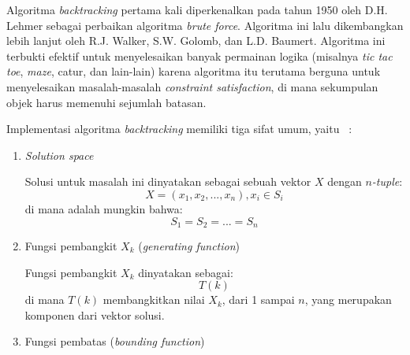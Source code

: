 Algoritma \textit{backtracking} pertama kali diperkenalkan pada tahun 1950 oleh D.H. Lehmer sebagai perbaikan algoritma \textit{brute force}. Algoritma ini lalu dikembangkan lebih lanjut oleh R.J. Walker, S.W. Golomb, dan L.D. Baumert. Algoritma ini terbukti efektif untuk menyelesaikan banyak permainan logika (misalnya \textit{tic tac toe}, \textit{maze}, catur, dan lain-lain) karena algoritma itu terutama berguna untuk menyelesaikan masalah-masalah \textit{constraint satisfaction}, di mana sekumpulan objek harus memenuhi sejumlah batasan.

Implementasi algoritma \textit{backtracking} memiliki tiga sifat umum, yaitu ~\cite{fahda:16:backtracking}:
\begin{enumerate}
\item \textit{Solution space}

Solusi untuk masalah ini dinyatakan sebagai sebuah vektor \begin{math}X\end{math} dengan \textit{\begin{math}n\end{math}-tuple}:
\begin{displaymath}
X = (x_1, x_2, ..., x_n), x_i \in S_i
\end{displaymath}
di mana adalah mungkin bahwa:
\begin{displaymath}
S_1 = S_2 = ... = S_n
\end{displaymath} 

\item Fungsi pembangkit \begin{math}X_k\end{math} (\textit{generating function})

Fungsi pembangkit \begin{math}X_k\end{math} dinyatakan sebagai:
\begin{displaymath}
T(k)
\end{displaymath}
di mana \begin{math}T(k)\end{math} membangkitkan nilai \begin{math}X_k\end{math}, dari 1 sampai \begin{math}n\end{math}, yang merupakan komponen dari vektor solusi.

\item Fungsi pembatas (\textit{bounding function})


\end{enumerate}
